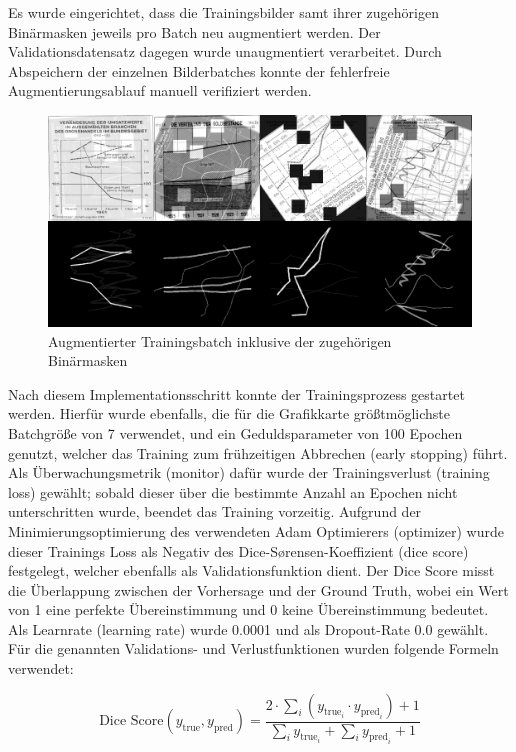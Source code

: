 Es wurde eingerichtet, dass die Trainingsbilder samt ihrer zugehörigen Binärmasken jeweils pro Batch neu augmentiert werden. Der Validationsdatensatz dagegen wurde unaugmentiert verarbeitet. Durch Abspeichern der einzelnen Bilderbatches konnte der fehlerfreie Augmentierungsablauf manuell verifiziert werden.

\begin{figure}[h!]
    \centering
    \captionsetup{width=.75\linewidth}
    \includegraphics[width=.75\textwidth]{Implementation/img/unet_training.png}
    \caption{ Augmentierter Trainingsbatch inklusive der zugehörigen Binärmasken}
    \label{fig:unet_training}
\end{figure}

Nach diesem Implementationsschritt konnte der Trainingsprozess gestartet werden. Hierfür wurde ebenfalls, die für die Grafikkarte größtmöglichste Batchgröße von 7 verwendet, und ein Geduldsparameter von 100 Epochen genutzt, welcher das Training zum frühzeitigen Abbrechen (early stopping) führt. Als Überwachungsmetrik (monitor) dafür wurde der Trainingsverlust (training loss) gewählt; sobald dieser über die bestimmte Anzahl an Epochen nicht unterschritten wurde, beendet das Training vorzeitig. Aufgrund der Minimierungsoptimierung des verwendeten Adam Optimierers (optimizer) \cite{kingma2017adammethodstochasticoptimization} wurde dieser Trainings Loss als Negativ des Dice-Sørensen-Koeffizient (dice score) festgelegt, welcher ebenfalls als Validationsfunktion dient. Der Dice Score misst die Überlappung zwischen der Vorhersage und der Ground Truth, wobei ein Wert von 1 eine perfekte Übereinstimmung und 0 keine Übereinstimmung bedeutet. Als Learnrate (learning rate) wurde 0.0001 und als Dropout-Rate 0.0 gewählt. Für die genannten Validations- und Verlustfunktionen wurden folgende Formeln verwendet:

\begin{equation}
    \text{Dice Score}(y_{\text{true}}, y_{\text{pred}}) = \frac{2 \cdot \sum_{i} (y_{\text{true}_i} \cdot y_{\text{pred}_i}) + 1}{\sum_{i} y_{\text{true}_i} + \sum_{i} y_{\text{pred}_i} + 1} \nonumber
\end{equation}

